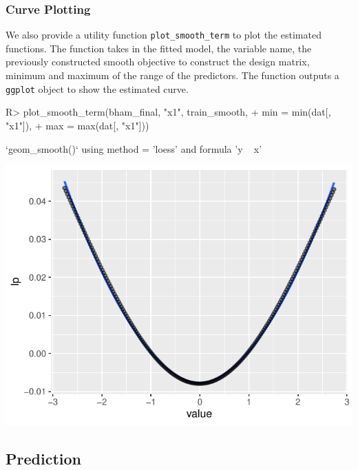 \documentclass[
]{jss}
\begin{document}
\subsubsection{Curve Plotting}

We also provide a utility function \texttt{plot\_smooth\_term} to plot
the estimated functions. The function takes in the fitted model, the
variable name, the previously constructed smooth objective to construct
the design matrix, minimum and maximum of the range of the predictors.
The function outputs a \texttt{ggplot} object to show the estimated
curve.

\begin{CodeChunk}
\begin{CodeInput}
R> plot_smooth_term(bham_final, "x1", train_smooth,
+                      min = min(dat[, "x1"]),
+                      max = max(dat[, "x1"]))
\end{CodeInput}
\begin{CodeOutput}
`geom_smooth()` using method = 'loess' and formula 'y ~ x'
\end{CodeOutput}


\begin{center}\includegraphics{BHAM_software_files/figure-latex/unnamed-chunk-13-1} \end{center}

\end{CodeChunk}

\subsection{Prediction}
\end{document}
